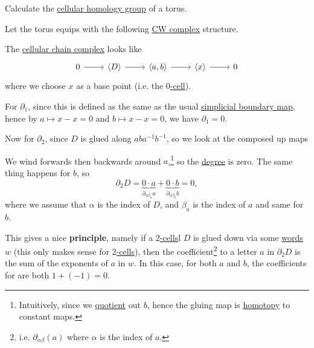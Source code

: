 \begin{eg}
	Calculate the \hyperref[def:cellular-homology-group]{cellular homology group} of a torus.
\end{eg}
\begin{explanation}
	Let the torus equips with the following \hyperref[def:CW-Complex]{CW complex} structure.
	\begin{figure}[H]
		\centering
		\label{fig:eg:lec31:CW-complex-torus}
	\end{figure}

	The \hyperref[def:cellular-chain-complex]{cellular chain complex} looks like
	\[
		\begin{tikzcd}
			0 & {\left<D\right>} & {\left<a, b\right>} & {\left<x\right>} & 0
			\arrow[from=1-1, to=1-2]
			\arrow[from=1-2, to=1-3]
			\arrow[from=1-3, to=1-4]
			\arrow[from=1-4, to=1-5]
		\end{tikzcd}
	\]
	where we choose \(x\) as a base point (i.e. the \hyperref[def:cell]{\(0\)-cell}).

	For \(\partial _1\), since this is defined as the same as the usual \hyperref[def:boundary-homomorphism]{simplicial boundary map},
	hence by \(a \mapsto x - x = 0\) and \(b \mapsto x - x = 0\), we have \(\partial_1 = 0\).

	Now for \(\partial _2\), since \(D\) is glued along \(aba^{-1}b^{-1}\), so we look at the composed up maps
	\begin{figure}[H]
		\centering
		\label{fig:eg:cellular-homology-calc-torus}
	\end{figure}
	We wind forwards then backwards around \(a\),\footnote{Intuitively, since we \hyperref[CW-complex-quotient]{quotient} out \(b\),
		hence the gluing map is \hyperref[def:homotopy]{homotopy} to constant maps.} so the \hyperref[def:degree]{degree} is zero.
	The same thing happens for \(b\), so
	\[
		\partial_2 D = \underbrace{0 \cdot a}_{\partial_{\alpha \beta_a }a} + \underbrace{0 \cdot b}_{\partial _{\alpha \beta_b } b} = 0,
	\]
	where we assume that \(\alpha\) is the index of \(D\), and \(\beta _a\) is the index of \(a\) and same for \(b\).

	This gives a nice \textbf{principle}, namely if a \hyperref[def:cell]{\(2\)-cells}l \(D\) is glued down via some \hyperref[def:word]{words}
	\(w\) (this only makes sense for \hyperref[def:cell]{\(2\)-cells}), then the
	coefficient\footnote{i.e. \(\partial_{\alpha \beta } (a)\) where \(\alpha\) is the index of \(a\).} to a letter \(a\) in \(\partial_2 D\)
	is the sum of the exponents of \(a\) in \(w\).
	In this case, for both \(a\) and \(b\), the coefficients for are both \(1 + (-1) = 0\).


\end{explanation}
